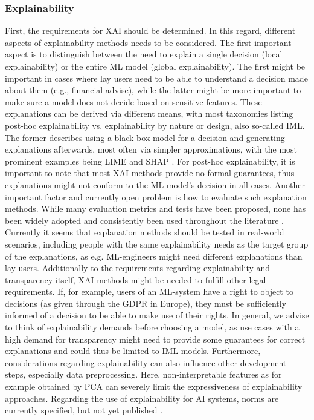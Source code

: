 \subsubsection{Explainability}
First, the requirements for \ac{XAI} should be determined. In this regard, different aspects of explainability methods needs to be considered.
The first important aspect is to distinguish between the need to explain a single decision (local explainability) or the entire ML model (global explainability).
The first might be important in cases where lay users need to be able to understand a decision made about them (e.g., financial advise), while the latter might be more important to make sure a model does not decide based on sensitive features.
These explanations can be derived via different means, with most taxonomies listing post-hoc explainability vs. explainability by nature or design, also so-called \ac{IML}.
The former describes using a black-box model for a decision and generating explanations afterwards, most often via simpler approximations, with the most prominent examples being LIME \citep{ribeiro2016_lime} and SHAP \citep{lundberg2017_shap}.
For post-hoc explainability, it is important to note that most \ac{XAI}-methods provide no formal guarantees, thus explanations might not conform to the ML-model's decision in all cases.
Another important factor and currently open problem is how to evaluate such explanation methods. While many evaluation metrics and tests have been proposed, none has been widely adopted and consistently been used throughout the literature \citep{nauta2022_XAIreview, Burkart_Explainability}.
Currently it seems that explanation methods should be tested in real-world scenarios, including people with the same explainability needs as the target group of the explanations, as e.g. ML-engineers might need different explanations than lay users.
Additionally to the requirements regarding explainability and transparency itself, \ac{XAI}-methods might be needed to fulfill other legal requirements.
If, for example, users of an ML-system have a right to object to decisions (as given through the \ac{GDPR} in Europe), they must be sufficiently informed of a decision to be able to make use of their rights.
In general, we advise to think of explainability demands before choosing a model, as use cases with a high demand for transparency might need to provide some guarantees for correct explanations and could thus be limited to \ac{IML} models.
Furthermore,  considerations regarding explainability can also influence other development steps, especially data preprocessing.
Here, non-interpretable features as for example obtained by \ac{PCA} can severely limit the expressiveness of explainability approaches.
Regarding the use of explainability for AI systems, norms are currently specified, but not yet published \citep{DIN-Spec-92001-3,ISO6254-explainability}.

